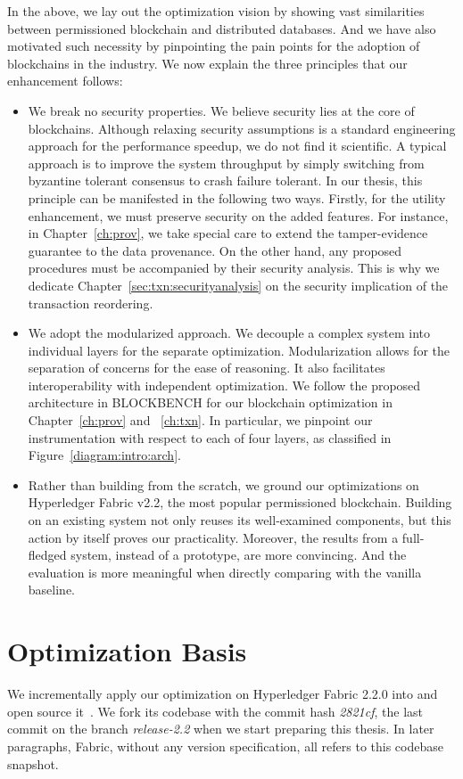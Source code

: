 In the above, we lay out the optimization vision by showing vast similarities between permissioned blockchain and distributed databases. 
And we have also motivated such necessity by pinpointing the pain points for the adoption of blockchains in the industry. 
We now explain the three principles that our enhancement follows:

\begin{itemize}
  \item We break no security properties. We believe security lies at the core of blockchains. Although relaxing security assumptions is a standard engineering approach for the performance speedup, we do not find it scientific. A typical approach is to improve the system throughput by simply switching from byzantine tolerant consensus to crash failure tolerant. In our thesis, this principle can be manifested in the following two ways. Firstly, for the utility enhancement, we must preserve security on the added features. For instance, in Chapter~\ref{ch:prov}, we take special care to extend the tamper-evidence guarantee to the data provenance. On the other hand, any proposed procedures must be accompanied by their security analysis. This is why we dedicate Chapter~\ref{sec:txn:securityanalysis} on the security implication of the transaction reordering. 
  \item We adopt the modularized approach. We decouple a complex system into individual layers for the separate optimization. Modularization allows for the separation of concerns for the ease of reasoning. It also facilitates interoperability with independent optimization. 
  We follow the proposed architecture in BLOCKBENCH for our blockchain optimization in Chapter~\ref{ch:prov} and ~\ref{ch:txn}. In particular, we pinpoint our instrumentation with respect to each of four layers, as classified in Figure~\ref{diagram:intro:arch}. 
  \item Rather than building from the scratch, we ground our optimizations on Hyperledger Fabric v2.2, the most popular permissioned blockchain. Building on an existing system not only reuses its well-examined components, but this action by itself proves our practicality. Moreover, the results from a full-fledged system, instead of a prototype, are more convincing. And the evaluation is more meaningful when directly comparing with the vanilla baseline. 
\end{itemize}

\section{Optimization Basis}
\label{sec:intro:basis}
We incrementally apply our optimization on Hyperledger Fabric 2.2.0 into {\fs} and open source it~\cite{fsharp}. We fork its codebase with the commit hash \textit{2821cf}, the last commit on the branch \textit{release-2.2} when we start preparing this thesis. In later paragraphs, Fabric, without any version specification, all refers to this codebase snapshot. 

